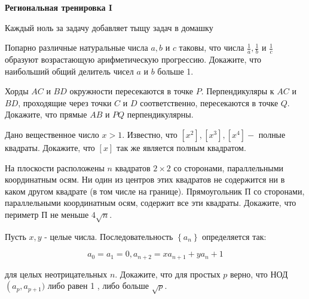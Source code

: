 \centerline{\bf \Huge Региональная тренировка I}

\begin{flushright}
        \scriptsize{Каждый ноль за задачу добавляет тыщу задач в домашку}
\end{flushright}

Попарно различные натуральные числа $a, b$ и $c$ таковы, что числа $\frac{1}{a}, \frac{1}{b}$ и $\frac{1}{c}$ образуют возрастающую арифметическую прогрессию. Докажите, что наибольший общий делитель чисел $a$ и $b$ больше 1.

Хорды $A C$ и $B D$ окружности пересекаются в точке $P$. Перпендикуляры к $A C$ и $B D$, проходящие через точки $C$ и $D$ соответственно, пересекаются в точке $Q$. Докажите, что прямые $A B$ и $P Q$ перпендикулярны.

Дано вещественное число $x>1$. Известно, что $\left[x^2\right],\left[x^3\right],\left[x^4\right]-$ полные квадраты. Докажите, что $[x]$ так же является полным квадратом.

На плоскости расположены $n$ квадратов $2 \times 2$ со сторонами, параллельными координатным осям. Ни один из центров этих квадратов не содержится ни в каком другом квадрате (в том числе на границе). Прямоугольник П со сторонами, параллельными координатным осям, содержит все эти квадраты. Докажите, что периметр П не меньше $4 \sqrt{n}$.

Пусть $x, y$ - целые числа. Последовательность $\left\{a_n\right\}$ определяется так:

$$
a_0=a_1=0, a_{n+2}=x a_{n+1}+y a_n+1
$$


для целых неотрицательных $n$. Докажите, что для простых $p$ верно, что НОД$\left(a_p, a_{p+1})\right.$ либо равен 1 , либо больше $\sqrt{p}$.